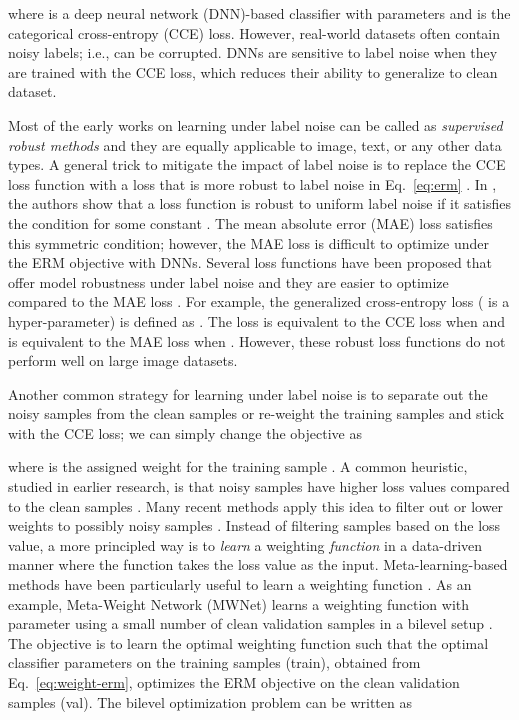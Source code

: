 \documentclass[final]{cvpr}
\begin{document}
where  is a deep neural network (DNN)-based classifier 
with parameters  and  is the categorical cross-entropy (CCE) loss. However, real-world datasets often contain noisy labels; i.e.,  can be corrupted. DNNs are sensitive to label noise when they are trained with the CCE loss, which reduces their ability to generalize to clean dataset.

Most of the early works on learning under label noise can be called as \emph{supervised robust methods} and they are equally applicable to image, text, or any other data types. A general trick
 to mitigate the impact of 
label noise is to replace the CCE loss function  with a loss that is more robust to label noise 
in Eq.~\ref{eq:erm} \cite{generalized-ce,peer,normalized-loss,ghosh2015,ghosh2017-dt,ghosh2017,unhinged,peer,ldmi}. In \cite{ghosh2017},  the authors show that a loss function  is robust to uniform label noise if it
satisfies the condition  for some constant . The mean absolute error (MAE) loss satisfies this symmetric condition; however, the MAE loss is difficult to optimize under the ERM objective with DNNs. Several loss functions have been proposed that offer model robustness under label noise and  they are easier to optimize compared to the MAE loss \cite{peer,ldmi,generalized-ce,normalized-loss}. For example, the generalized cross-entropy loss  ( is a hyper-parameter) is defined as \cite{generalized-ce}
    .
The  loss is equivalent to the CCE loss when  and is equivalent to the MAE loss when . However, these robust loss functions do not perform well on large image datasets. 

Another common strategy for learning under label noise is to separate out the noisy samples from the clean samples or re-weight the training samples and stick with the CCE loss; we can simply change the objective as\vspace{-0.2cm}

where  is the assigned weight for the training sample . 
A common heuristic, studied in earlier research, is that noisy samples have higher loss values compared to the clean samples \cite{identifying-mislabeled,identifying}. 
Many recent methods apply this idea to filter out or lower weights to possibly noisy samples \cite{s-model,co-teaching,joint,webly,co-teaching,mentornet,joint,veit2017learning,yuan2018iterative,focal,reed,masking}. Instead of filtering samples based on the loss value, a more principled way is to \emph{learn} a weighting \emph{function}  in a data-driven manner where the function takes the loss value as the input. 
Meta-learning-based methods have been particularly useful to learn a weighting function \cite{mwnet,robust-mwnet,l2rw,l2l-noise}. As an example, 
Meta-Weight Network (MWNet) \cite{mwnet} learns a weighting function  with parameter  using a small number of clean  validation samples in a bilevel setup \cite{bilevel}. The objective is to learn the optimal weighting function  such that the optimal classifier parameters  on the training samples (train), obtained from Eq.~\ref{eq:weight-erm}, optimizes the ERM objective on the clean validation samples (val). The bilevel optimization problem can be written as \vspace{-0.2cm}
\end{document}
